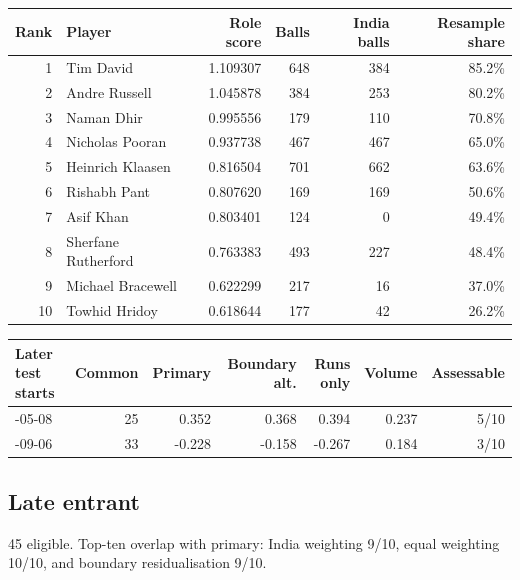\begin{center}
\begin{tabularx}{\linewidth}{r>{\raggedright\arraybackslash}Xrrrr}
\toprule
Rank & Player & Role score & Balls & India balls & Resample share \\
\midrule
1 & Tim David & 1.109307 & 648 & 384 & 85.2\% \\
2 & Andre Russell & 1.045878 & 384 & 253 & 80.2\% \\
3 & Naman Dhir & 0.995556 & 179 & 110 & 70.8\% \\
4 & Nicholas Pooran & 0.937738 & 467 & 467 & 65.0\% \\
5 & Heinrich Klaasen & 0.816504 & 701 & 662 & 63.6\% \\
6 & Rishabh Pant & 0.807620 & 169 & 169 & 50.6\% \\
7 & Asif Khan & 0.803401 & 124 & 0 & 49.4\% \\
8 & Sherfane Rutherford & 0.763383 & 493 & 227 & 48.4\% \\
9 & Michael Bracewell & 0.622299 & 217 & 16 & 37.0\% \\
10 & Towhid Hridoy & 0.618644 & 177 & 42 & 26.2\% \\
\bottomrule
\end{tabularx}
\end{center}

\begin{center}
\begin{tabularx}{\linewidth}{>{\raggedright\arraybackslash}Xrrrrrr}
\toprule
Later test starts & Common & Primary & Boundary alt. & Runs only & Volume & Assessable \\
\midrule
2024-05-08 & 25 & 0.352 & 0.368 & 0.394 & 0.237 & 5/10 \\
2025-09-06 & 33 & -0.228 & -0.158 & -0.267 & 0.184 & 3/10 \\
\bottomrule
\end{tabularx}
\end{center}

\subsection{Late entrant}

45 eligible. Top-ten overlap with primary: India weighting 9/10, equal weighting 10/10, and boundary residualisation 9/10.

